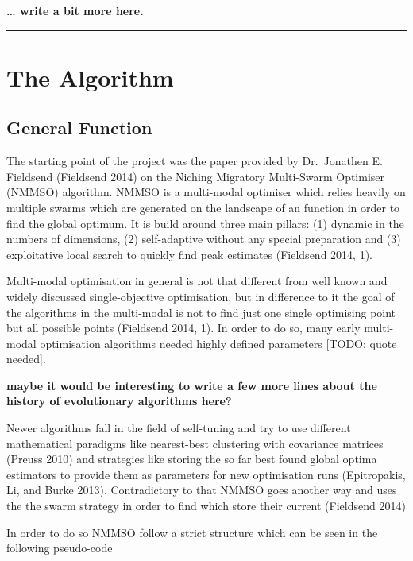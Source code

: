 \documentclass[12pt,a4paper]{article}
\begin{document}
\textbf{\ldots{} write a bit more here.}

\begin{center}\rule{0.5\linewidth}{\linethickness}\end{center}

\section{The Algorithm}\label{the-algorithm}

\subsection{General Function}\label{general-function}

The starting point of the project was the paper provided by Dr.~Jonathen
E. Fieldsend (Fieldsend 2014) on the Niching Migratory Multi-Swarm
Optimiser (NMMSO) algorithm. NMMSO is a multi-modal optimiser which
relies heavily on multiple swarms which are generated on the landscape
of an function in order to find the global optimum. It is build around
three main pillars: (1) dynamic in the numbers of dimensions, (2)
self-adaptive without any special preparation and (3) exploitative local
search to quickly find peak estimates (Fieldsend 2014, 1).

Multi-modal optimisation in general is not that different from well
known and widely discussed single-objective optimisation, but in
difference to it the goal of the algorithms in the multi-modal is not to
find just one single optimising point but all possible points (Fieldsend
2014, 1). In order to do so, many early multi-modal optimisation
algorithms needed highly defined parameters {[}TODO: quote needed{]}.

\textbf{maybe it would be interesting to write a few more lines about
the history of evolutionary algorithms here?}

Newer algorithms fall in the field of self-tuning and try to use
different mathematical paradigms like nearest-best clustering with
covariance matrices (Preuss 2010) and strategies like storing the so far
best found global optima estimators to provide them as parameters for
new optimisation runs (Epitropakis, Li, and Burke 2013). Contradictory
to that NMMSO goes another way and uses the the swarm strategy in order
to find which store their current (Fieldsend 2014)

In order to do so NMMSO follow a strict structure which can be seen in
the following pseudo-code
\end{document}
